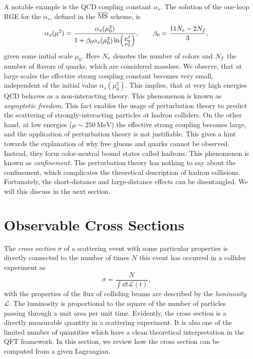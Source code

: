 A notable example is the QCD coupling constant $\alpha_s$.
The solution of the one-loop RGE for the $\alpha_s$, defined in the $\overline{\text{MS}}$ scheme, is
\begin{align}
  \alpha_s(\mu^2)=\frac{\alpha_s(\mu_0^2)}{1+\beta_0 \alpha_s(\mu_0^2)\ln(\frac{\mu^2}{\mu_0^2})}, \qquad \beta_0=\frac{11 {N_c}-2{N_f}}{3},
\end{align}
given some initial scale $\mu_0$.  
Here ${N_c}$ denotes the number of colors and ${N_f}$ the number of flavors of quarks, which are considered massless.
We observe, that at large scales the effective strong coupling constant becomes very small, independent of the initial value $\alpha_s(\mu_0^2)$.
This implies, that at very high energies QCD behaves as a non-interacting theory. This phenomenon is known as \emph{asymptotic freedom}.
This fact enables the usage of perturbation theory to predict the scattering of strongly-interacting particles at hadron colliders.
On the other hand, at low energies ($\mu \sim 250~\text{MeV}$) the effective strong coupling becomes large, and the application of perturbation theory is not justifiable.
This gives a hint towards the explanation of why free gluons and quarks cannot be observed.
Instead, they form color-neutral bound states called hadrons.
This phenomenon is known as \emph{confinement}. 
The perturbation theory has nothing to say about the confinement, which
complicates the theoretical description of hadron collisions.
Fortunately, the short-distance and large-distance effects can be disentangled.
We will this discuss in the next section.


\section{Observable Cross Sections}
\label{sec:hadcoll}

The \emph{cross section} $\sigma$ of a scattering event with some particular properties
is directly connected to the number of times $N$ this event has occurred in a collider experiment as
\begin{equation}
\sigma  = \frac{N}{ \int \dd{t} \mathcal{L}(t)},
\end{equation}
with the properties of the flux of colliding beams are described by the \emph{luminosity} $\mathcal{L}$.
The luminosity is proportional to the square of the number of particles passing through a unit area per unit time.
Evidently, the cross section is a directly measurable quantity in a scattering experiment.
It is also one of the limited number of quantities which have a clean theoretical interpretation in the QFT framework.
In this section, we review how the cross section can be computed from a given Lagrangian.


